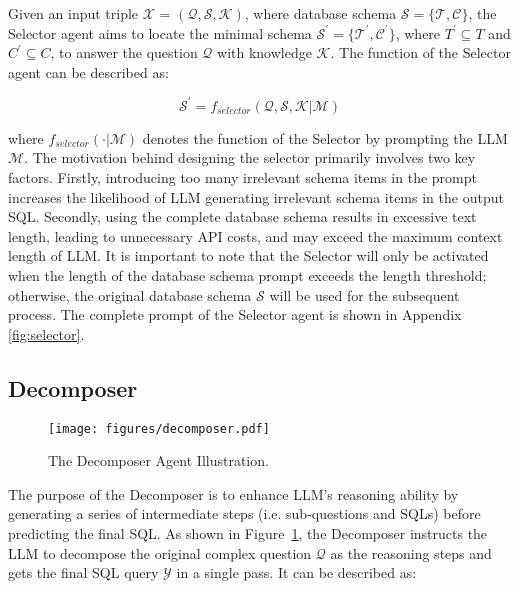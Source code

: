Given an input triple $\mathcal{X}$ = $(\mathcal{Q}, \mathcal{S}, \mathcal{K})$, where database schema $\mathcal{S} = \{\mathcal{T},\mathcal{C}\}$, the Selector agent aims to locate the minimal schema $\mathcal{S^{'}} = \{\mathcal{T^{'}},\mathcal{C^{'}}\}$, where $T^{'} \subseteq T$ and $C^{'} \subseteq C$, to answer the question $\mathcal{Q}$ with knowledge $\mathcal{K}$. The function of the Selector agent can be described as:

\begin{equation}
\mathcal{S}^{'} = f_{selector}( \mathcal{Q}, \mathcal{S}, \mathcal{K} | \mathcal{M})
\label{eq:selector}
\end{equation}

where $f_{selector}( \cdot | \mathcal{M})$ denotes the function of the Selector by prompting the LLM $\mathcal{M}$. 
The motivation behind designing the selector primarily involves two key factors.
Firstly, introducing too many irrelevant schema items in the prompt increases the likelihood of LLM generating irrelevant schema items in the output SQL. 
Secondly, using the complete database schema results in excessive text length, leading to unnecessary API costs, and may exceed the maximum context length of LLM.
It is important to note that the Selector will only be activated when the length of the database schema prompt exceeds the length threshold; otherwise, the original database schema $\mathcal{S}$ will be used for the subsequent process.
The complete prompt of the Selector agent is shown in Appendix \ref{fig:selector}.

\subsection{Decomposer}
\label{sec:decomposer}

\begin{figure}[t]
    \centering
    \texttt{[image: figures/decomposer.pdf]}
    \caption{The Decomposer Agent Illustration.}
    \label{fig:decomposer}
\end{figure}

The purpose of the Decomposer is to enhance LLM's reasoning ability by generating a series of intermediate steps (i.e. sub-questions and SQLs) before predicting the final SQL.
As shown in Figure~\ref{fig:decomposer}, the Decomposer instructs the LLM to decompose the original complex question $\mathcal{Q}$ as the reasoning steps and gets the final SQL query $\mathcal{Y}$ in a single pass.
It can be described as:

